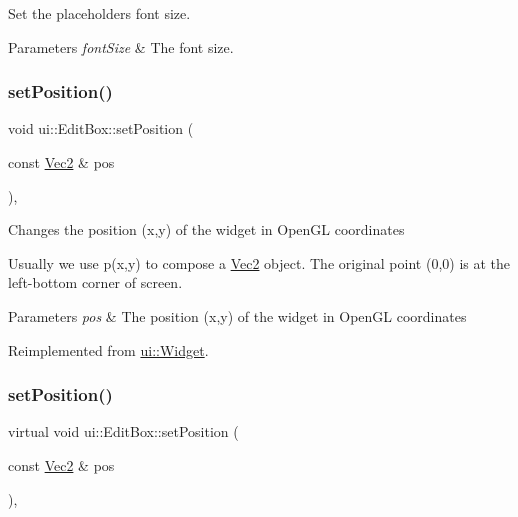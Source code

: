 Set the placeholder\textquotesingle{}s font size. 
\begin{DoxyParams}{Parameters}
{\em font\+Size} & The font size. \\
\hline
\end{DoxyParams}
\mbox{\label{classui_1_1EditBox_a9920fc994750f83db1c80be0417143f6}} 
\subsubsection{\texorpdfstring{set\+Position()}{setPosition()}\hspace{0.1cm}{\footnotesize\ttfamily [1/2]}}
{\footnotesize\ttfamily void ui\+::\+Edit\+Box\+::set\+Position (\begin{DoxyParamCaption}\item[{const \hyperlink{classVec2}{Vec2} \&}]{pos }\end{DoxyParamCaption})\hspace{0.3cm}{\ttfamily [override]}, {\ttfamily [virtual]}}

Changes the position (x,y) of the widget in Open\+GL coordinates

Usually we use p(x,y) to compose a \hyperlink{classVec2}{Vec2} object. The original point (0,0) is at the left-\/bottom corner of screen.


\begin{DoxyParams}{Parameters}
{\em pos} & The position (x,y) of the widget in Open\+GL coordinates \\
\hline
\end{DoxyParams}


Reimplemented from \hyperlink{classui_1_1Widget_ad1983665a8a2463e77c9ff7e13fcac97}{ui\+::\+Widget}.

\mbox{\label{classui_1_1EditBox_a92e525c7152c0a974632d4810b392f11}} 
\subsubsection{\texorpdfstring{set\+Position()}{setPosition()}\hspace{0.1cm}{\footnotesize\ttfamily [2/2]}}
{\footnotesize\ttfamily virtual void ui\+::\+Edit\+Box\+::set\+Position (\begin{DoxyParamCaption}\item[{const \hyperlink{classVec2}{Vec2} \&}]{pos }\end{DoxyParamCaption})\hspace{0.3cm}{\ttfamily [override]}, {\ttfamily [virtual]}}


